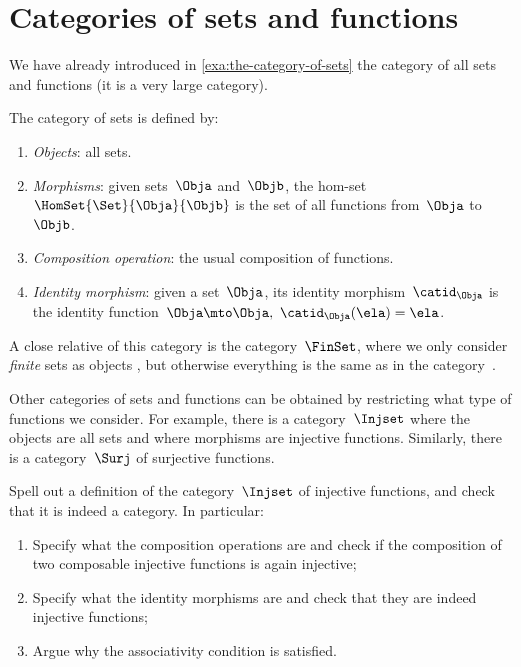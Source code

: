 
\section{Categories of sets and functions}

We have already introduced in \cref{exa:the-category-of-sets} the category of all sets and functions (it is a very large category).

\begin{ctdefinition}
    \label{def:Set}
    The category of sets \Set is defined by:
    \begin{enumerate}
        \item \emph{Objects}: all sets.
        \item \emph{Morphisms}: given sets~$\Obja$ and~$\Objb$, the hom-set~$\HomSet{\Set}{\Obja}{\Objb}$ is the set of all functions from~$\Obja$ to~$\Objb$.
        \item \emph{Composition operation}: the usual composition of functions.
        \item \emph{Identity morphism}: given a set~$\Obja$, its identity morphism~$\catid_\Obja$ is the identity function~$\Obja \mto \Obja, \ \catid_\Obja(\ela) = \ela$.
    \end{enumerate}
\end{ctdefinition}

A close relative of this category is the category~$\FinSet$, where we only consider \emph{finite} sets as objects , but otherwise everything is the same as in the category~\Set.

Other categories of sets and functions can be obtained by restricting what type of functions we consider.
For example, there is a category~$\Injset$ where the objects are all sets and where morphisms are injective functions.
Similarly, there is a category~$\Surj$ of surjective functions.

\begin{exercise}
    Spell out a definition of the category~$\Injset$ of injective functions, and check that it is indeed a category.
    In particular:
    \begin{enumerate}
        \item Specify what the composition operations are and check if the composition of two composable injective functions is again injective;
        \item Specify what the identity morphisms are and check that they are indeed injective functions;
        \item Argue why the associativity condition is satisfied.
    \end{enumerate}
\end{exercise}

